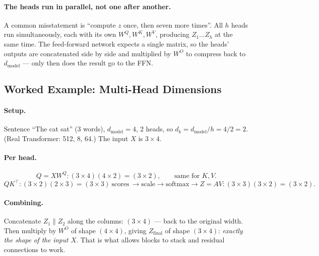 \documentclass[11pt,a4paper]{article}
\begin{document}
\paragraph{The heads run in parallel, not one after another.} A common misstatement is
``compute $z$ once, then seven more times''. All $h$ heads run simultaneously, each with its
own $W^Q, W^K, W^V$, producing $Z_1 \ldots Z_h$ at the same time. The feed-forward network
expects a single matrix, so the heads' outputs are concatenated side by side and multiplied
by $W^O$ to compress back to $d_{\text{model}}$ --- only then does the result go to the FFN.

\subsection{Worked Example: Multi-Head Dimensions}

\paragraph{Setup.} Sentence ``The cat sat'' (3 words), $d_{\text{model}} = 4$, 2 heads, so
$d_k = d_{\text{model}}/h = 4/2 = 2$. (Real Transformer: 512, 8, 64.) The input $X$ is
$3 \times 4$.

\paragraph{Per head.}
\[
Q = X W^Q: (3{\times}4)(4{\times}2) = (3{\times}2), \qquad \text{same for } K, V.
\]
\[
QK^\top: (3{\times}2)(2{\times}3) = (3{\times}3) \ \text{scores} \ \rightarrow
\text{scale} \rightarrow \text{softmax} \rightarrow
Z = AV: (3{\times}3)(3{\times}2) = (3{\times}2).
\]

\paragraph{Combining.} Concatenate $Z_1 \| Z_2$ along the columns: $(3 \times 4)$ --- back to
the original width. Then multiply by $W^O$ of shape $(4 \times 4)$, giving
$Z_{\text{final}}$ of shape $(3 \times 4)$: \emph{exactly the shape of the input $X$}. That
is what allows blocks to stack and residual connections to work.
\end{document}
